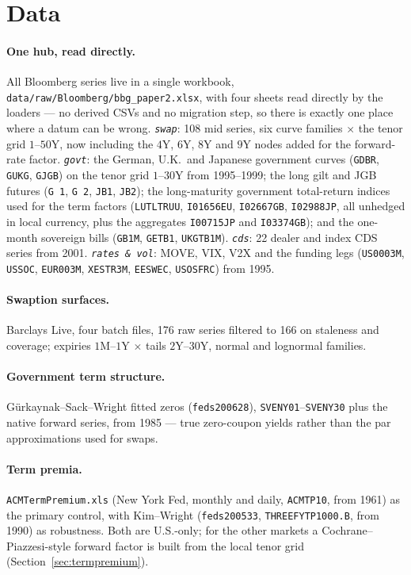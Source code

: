 \documentclass[11pt]{article}
\begin{document}
\section{Data}\label{sec:data}

\paragraph{One hub, read directly.} All Bloomberg series live in a single workbook,
\texttt{data/raw/Bloomberg/bbg\_paper2.xlsx}, with four sheets read directly by the loaders --- no
derived CSVs and no migration step, so there is exactly one place where a datum can be wrong.
\emph{\texttt{swap}}: 108 mid series, six curve families $\times$ the tenor grid $1$--$50$Y, now
including the $4$Y, $6$Y, $8$Y and $9$Y nodes added for the forward-rate factor.
\emph{\texttt{govt}}: the German, U.K.\ and Japanese government curves (\texttt{GDBR}, \texttt{GUKG},
\texttt{GJGB}) on the tenor grid $1$--$30$Y from 1995--1999; the long gilt and JGB futures
(\texttt{G 1}, \texttt{G 2}, \texttt{JB1}, \texttt{JB2}); the long-maturity government total-return
indices used for the term factors (\texttt{LUTLTRUU}, \texttt{I01656EU}, \texttt{I02667GB},
\texttt{I02988JP}, all unhedged in local currency, plus the aggregates \texttt{I00715JP} and
\texttt{I03374GB}); and the one-month sovereign bills (\texttt{GB1M}, \texttt{GETB1},
\texttt{UKGTB1M}). \emph{\texttt{cds}}: 22 dealer and index CDS series from 2001.
\emph{\texttt{rates \& vol}}: MOVE, VIX, V2X and the funding legs (\texttt{US0003M},
\texttt{USSOC}, \texttt{EUR003M}, \texttt{XESTR3M}, \texttt{EESWEC}, \texttt{USOSFRC}) from 1995.

\paragraph{Swaption surfaces.} Barclays Live, four batch files, 176 raw series filtered to 166 on
staleness and coverage; expiries $1$M--$1$Y $\times$ tails $2$Y--$30$Y, normal and lognormal families.

\paragraph{Government term structure.} Gürkaynak--Sack--Wright fitted zeros (\texttt{feds200628}),
\texttt{SVENY01}--\texttt{SVENY30} plus the native forward series, from 1985 --- true zero-coupon
yields rather than the par approximations used for swaps.

\paragraph{Term premia.} \texttt{ACMTermPremium.xls} (New York Fed, monthly and daily,
\texttt{ACMTP10}, from 1961) as the primary control, with Kim--Wright (\texttt{feds200533},
\texttt{THREEFYTP1000.B}, from 1990) as robustness. Both are U.S.-only; for the other markets a
Cochrane--Piazzesi-style forward factor is built from the local tenor grid
(Section~\ref{sec:termpremium}).
\end{document}
